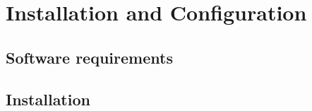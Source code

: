\chapter{Installation and Configuration}

\section{Software requirements}


\section{Installation}
\label{sec:install}

